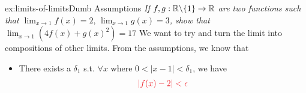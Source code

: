 \documentclass[landscape, 8pt]{extarticle}
\begin{document}
\begin{multicols}{3}
\begin{xmp}{ex:limits-of-limits}{Dumb Assumptions}
\textit{If $f,g:\mathbb{R}\backslash\{1\}\to \mathbb{R}$ are two functions such that $\lim_{x\to 1} f(x)=2,\, \lim_{x\to 1} g(x)=3$, show that $\lim_{x\to 1} (4f(x)+g(x)^{2}) = 17$}
We want to try and turn the limit into compositions of other limits. From the assumptions, we know that
\renewcommand\labelitemi{\tiny$\bullet$}
\begin{itemize}
    \setlength\itemsep{0em}
    \item There exists a $\delta_{1}$ s.t. $\forall x$ where $0<\lvert x-1\rvert < \delta_{1}$, we have
    \begin{align}{\color{colour1}
        \lvert f(x) - 2\rvert < \epsilon \label{align:fx}
    }\end{align}
    

\end{itemize}
\end{xmp}
\end{multicols}
\end{document}
